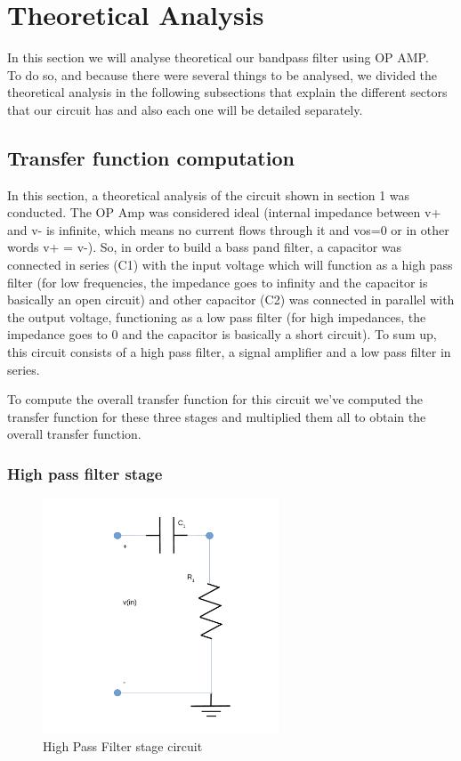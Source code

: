 \section{Theoretical Analysis}
\label{sec:analysis}

In this section we will analyse theoretical our bandpass filter using OP AMP. \\
To do so, and because there were several things to be analysed, we divided the theoretical analysis in the following subsections that explain the different sectors that our circuit has and also each one will be detailed separately.\\

\subsection{Transfer function computation}

In this section, a theoretical analysis of the circuit shown in section 1 was conducted. The OP Amp was considered ideal (internal impedance between v+ and v- is infinite, which means no current flows through it and vos=0 or in other words v+ = v-). So, in order to build a bass pand filter, a capacitor was connected in series (C1) with the input voltage which will function as a high pass filter (for low frequencies, the impedance goes to infinity and the capacitor is basically an open circuit)  and other capacitor (C2) was connected in parallel with the output voltage, functioning as a low pass filter (for high impedances, the impedance goes to 0 and the capacitor is basically a short circuit). To sum up, this circuit consists of a high pass filter, a signal amplifier and a low pass filter in series.

To compute the overall transfer function for this circuit we've computed the transfer function for these three stages and multiplied them all to obtain the overall transfer function.

\subsubsection{High pass filter stage}

\begin{figure}[H] 
\centering
\includegraphics[width= 7cm]{high_pass_l5.pdf} 
\caption{High Pass Filter stage circuit}
\label{hf}
\end{figure}

